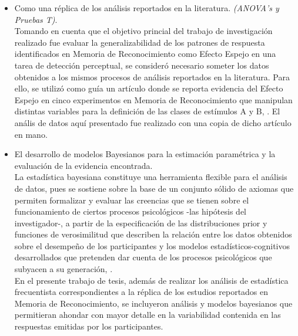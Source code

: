 \begin{itemize}
\item Como una réplica de los análisis reportados en la literatura. \textit{(ANOVA's y Pruebas T)}.\\

Tomando en cuenta que el objetivo princial del trabajo de investigación realizado fue evaluar la generalizabilidad de los patrones de respuesta identificados en Memoria de Reconocimiento como Efecto Espejo en una tarea de detección perceptual, se consideró necesario someter los datos obtenidos a los mismos procesos de análisis reportados en la literatura. Para ello, se utilizó como guía un artículo donde se reporta evidencia del Efecto Espejo en cinco experimentos en Memoria de Reconocimiento que manipulan distintas variables para la definición de las clases de estímulos A y B, \parencite{Glanzer1990}. El anális de datos aquí presentado fue realizado con una copia de dicho artículo en mano.\\ 

\item El desarrollo de modelos Bayesianos para la estimación paramétrica y la evaluación de la evidencia encontrada.\\

La estadística bayesiana constituye una herramienta flexible para el análisis de datos, pues se sostiene sobre la base de un conjunto sólido de axiomas que permiten formalizar y evaluar las creencias que se tienen sobre el funcionamiento de ciertos procesos psicológicos -las hipótesis del investigador-, a partir de la especificación de las distribuciones prior y funciones de verosimilitud que describen la relación entre los datos obtenidos sobre el desempeño de los participantes y los modelos estadísticos-cognitivos desarrollados que pretenden dar cuenta de los procesos psicológicos que subyacen a su generación, \parencite{Lee2011}.\\

En el presente trabajo de tesis, además de realizar los análisis de estadística frecuentista correspondientes a la réplica de los estudios reportados en Memoria de Reconocimiento, se incluyeron análisis y modelos bayesianos que permitieran ahondar con mayor detalle en la variabilidad contenida en las respuestas emitidas por los participantes.\\
\end{itemize}











